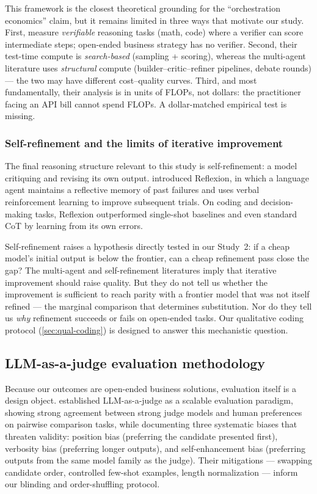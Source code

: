 \documentclass[12pt,a4paper]{article}
\begin{document}
This framework is the closest theoretical grounding for the ``orchestration
economics'' claim, but it remains limited in three ways that motivate our study.
First, \citet{SnellEtAl2024} measure \emph{verifiable} reasoning tasks (math,
code) where a verifier can score intermediate steps; open-ended business
strategy has no verifier. Second, their test-time compute is
\emph{search-based} (sampling + scoring), whereas the multi-agent literature
uses \emph{structural} compute (builder--critic--refiner pipelines, debate
rounds) --- the two may have different cost--quality curves. Third, and most
fundamentally, their analysis is in units of FLOPs, not dollars: the
practitioner facing an API bill cannot spend FLOPs. A dollar-matched empirical
test is missing.

\subsubsection{Self-refinement and the limits of iterative improvement}

The final reasoning structure relevant to this study is self-refinement: a
model critiquing and revising its own output. \citet{ShinnEtAl2023} introduced
Reflexion, in which a language agent maintains a reflective memory of past
failures and uses verbal reinforcement learning to improve subsequent trials.
On coding and decision-making tasks, Reflexion outperformed single-shot
baselines and even standard CoT by learning from its own errors.

Self-refinement raises a hypothesis directly tested in our Study~2: if a cheap
model's initial output is below the frontier, can a cheap refinement pass close
the gap? The multi-agent and self-refinement literatures imply that iterative
improvement should raise quality. But they do not tell us whether the
improvement is sufficient to reach parity with a frontier model that was not
itself refined --- the marginal comparison that determines substitution. Nor do
they tell us \emph{why} refinement succeeds or fails on open-ended tasks. Our
qualitative coding protocol (\cref{sec:qual-coding}) is designed to answer this
mechanistic question.

\subsection{LLM-as-a-judge evaluation methodology}

Because our outcomes are open-ended business solutions, evaluation itself is a
design object. \citet{ZhengEtAl2023} established LLM-as-a-judge as a scalable
evaluation paradigm, showing strong agreement between strong judge models and
human preferences on pairwise comparison tasks, while documenting three
systematic biases that threaten validity: position bias (preferring the
candidate presented first), verbosity bias (preferring longer outputs), and
self-enhancement bias (preferring outputs from the same model family as the
judge). Their mitigations --- swapping candidate order, controlled few-shot
examples, length normalization --- inform our blinding and order-shuffling
protocol.
\end{document}
